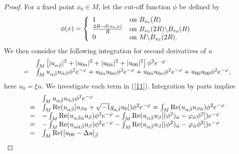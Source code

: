 \documentclass[12pt]{amsart}%
\numberwithin{equation}{section}
\begin{document}
\begin{proof}
For a fixed point $x_{0}\in M$, let the cut-off function $\phi$ be defined by%
\[%
\begin{array}
[c]{c}%
\phi(x)=\left\{
\begin{array}
[c]{ll}%
1 & \mathrm{on}\text{ }B_{x_{0}}(R)\\
\frac{2R-d(x_{0},x)}{R} & \mathrm{on}\text{ }B_{x_{0}}(2R)\backslash B_{x_{0}%
}(R)\\
0 & \mathrm{on}\text{ }M\backslash B_{x_{0}}(2R).
\end{array}
\right.
\end{array}
\]
We then consider the following integration for second derivatives of $u$
\begin{equation}%
\begin{array}
[c]{ll}
& \int_{M}\left[  |u_{\alpha\bar{\beta}}|^{2}+|u_{0\alpha}|^{2}+|u_{0\bar
{\alpha}}|^{2}+|u_{00}|^{2}\right]  \phi^{2}e^{-\varphi}\\
= & \int_{M}u_{\alpha\bar{\beta}}u_{\bar{\alpha}\beta}\phi^{2}e^{-\varphi
}+u_{0\alpha}u_{0\bar{\alpha}}\phi^{2}e^{-\varphi}+u_{0\bar{\alpha}}%
u_{0\alpha}\phi^{2}e^{-\varphi}+u_{00}u_{00}\phi^{2}e^{-\varphi},
\end{array}
\label{11}%
\end{equation}
here $u_{0}=\xi u.$ We investigate each term in (\ref{11}). Integration by
parts implies
\begin{equation}%
\begin{array}
[c]{ll}
& \int_{M}u_{\alpha\bar{\beta}}u_{\bar{\alpha}\beta}\phi^{2}e^{-\varphi}\\
= & \int_{M}\mathrm{\operatorname{Re}}(u_{\alpha\bar{\beta}}[u_{\beta
\bar{\alpha}}+\sqrt{-1}g_{\alpha\bar{\beta}}u_{0}])\phi^{2}e^{-\varphi}%
=\int_{M}\mathrm{\operatorname{Re}}(u_{\alpha\bar{\beta}}u_{\beta\bar{\alpha}%
})\phi^{2}e^{-\varphi}\\
= & -\int_{M}\mathrm{\operatorname{Re}}(u_{\alpha\bar{\beta}\bar{\alpha}%
}u_{\beta})\phi^{2}e^{-\varphi}-\int_{M}\mathrm{\operatorname{Re}}%
(u_{\alpha\bar{\beta}}u_{\beta}[(\phi^{2})_{\bar{\alpha}}-\varphi_{\bar
{\alpha}}\phi^{2}])e^{-\varphi}\\
= & -\int_{M}\mathrm{\operatorname{Re}}(u_{\alpha\bar{\alpha}\bar{\beta}%
}u_{\beta})\phi^{2}e^{-\varphi}-\int_{M}\mathrm{\operatorname{Re}}%
(u_{\alpha\bar{\beta}}u_{\beta}[(\phi^{2})_{\bar{\alpha}}-\varphi_{\bar
{\alpha}}\phi^{2}])e^{-\varphi}\\
= & \int_{M}\mathrm{\operatorname{Re}}([u_{00}-\Delta u]_{\bar{\beta}}%

\end{array}
\end{equation}
\end{proof}
\end{document}
